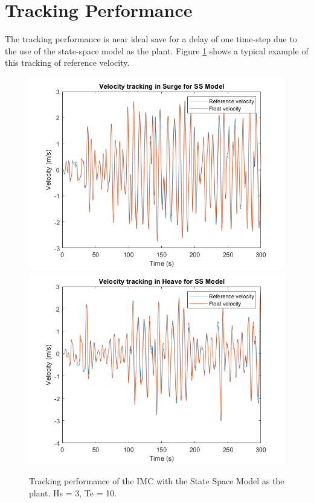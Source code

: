 \documentclass{report}
\begin{document}
\section{Tracking Performance}
The tracking performance is near ideal save for a delay of one time-step due to the use of the state-space model as the plant. Figure \ref{SSTracking} shows a typical example of this tracking of reference velocity.

\begin{figure}
\centering
\includegraphics[scale=0.5]{graphs/SS_surgeTracking}
\includegraphics[scale=0.5]{graphs/SS_heaveTracking}
\caption{Tracking performance of the IMC with the State Space Model as the plant. Hs = 3, Te = 10.}
\label{SSTracking}
\end{figure} 
\end{document}
